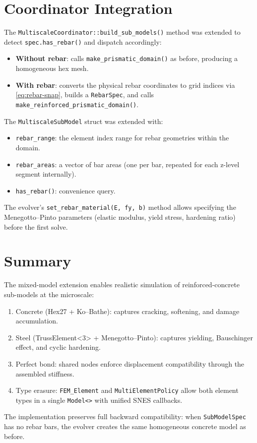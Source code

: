 \section{Coordinator Integration}
\label{sec:mixed-coord}

The \texttt{MultiscaleCoordinator::build\_sub\_models()} method was
extended to detect \texttt{spec.has\_rebar()} and dispatch accordingly:
\begin{itemize}
  \item \textbf{Without rebar}: calls \texttt{make\_prismatic\_domain()}
    as before, producing a homogeneous hex mesh.
  \item \textbf{With rebar}: converts the physical rebar coordinates to
    grid indices via \eqref{eq:rebar-snap}, builds a
    \texttt{RebarSpec}, and calls
    \texttt{make\_reinforced\_prismatic\_domain()}.
\end{itemize}

The \texttt{MultiscaleSubModel} struct was extended with:
\begin{itemize}
  \item \texttt{rebar\_range}: the element index range for rebar
    geometries within the domain.
  \item \texttt{rebar\_areas}: a vector of bar areas (one per bar,
    repeated for each z-level segment internally).
  \item \texttt{has\_rebar()}: convenience query.
\end{itemize}

The evolver's \texttt{set\_rebar\_material(E, fy, b)} method allows
specifying the Menegotto--Pinto parameters (elastic modulus, yield
stress, hardening ratio) before the first solve.


\section{Summary}
\label{sec:mixed-summary}

The mixed-model extension enables realistic simulation of
reinforced-concrete sub-models at the microscale:
\begin{enumerate}
  \item Concrete (Hex27 + Ko--Bathe): captures cracking, softening,
    and damage accumulation.
  \item Steel (TrussElement<3> + Menegotto--Pinto): captures yielding,
    Bauschinger effect, and cyclic hardening.
  \item Perfect bond: shared nodes enforce displacement compatibility
    through the assembled stiffness.
  \item Type erasure: \texttt{FEM\_Element} and
    \texttt{MultiElementPolicy} allow both element types in a single
    \texttt{Model<>} with unified SNES callbacks.
\end{enumerate}

The implementation preserves full backward compatibility: when
\texttt{SubModelSpec} has no rebar bars, the evolver creates the
same homogeneous concrete model as before.
